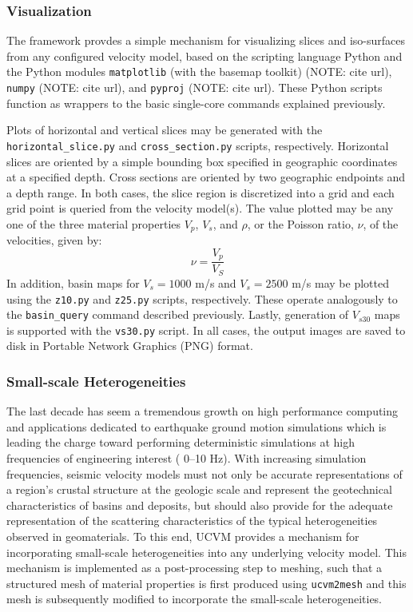 \subsubsection{Visualization}

The framework provdes a simple mechanism for visualizing slices and iso-surfaces from any configured velocity model, based on the scripting language Python and the Python modules \texttt{matplotlib} (with the basemap toolkit) (NOTE: cite url), \texttt{numpy} (NOTE: cite url), and \texttt{pyproj} (NOTE: cite url). These Python scripts function as wrappers to the basic single-core commands explained previously.

Plots of horizontal and vertical slices may be generated with the \texttt{horizontal\_slice.py} and \texttt{cross\_section.py} scripts, respectively. Horizontal slices are oriented by a simple bounding box specified in geographic coordinates at a specified depth. Cross sections are oriented by two geographic endpoints and a depth range. In both cases, the slice region is discretized into a grid and each grid point is queried from the velocity model(s). The value plotted may be any one of the three material properties $V_p$, $V_s$, and $\rho$, or the Poisson ratio, $\nu$, of the velocities, given by:
\begin{equation}
\nu = \frac{V_p}{V_S}
\end{equation}
In addition, basin maps for $V_s = 1000$ m/s and $V_s = 2500$ m/s may be plotted using the \texttt{z10.py} and \texttt{z25.py} scripts, respectively. These operate analogously to the \texttt{basin\_query} command described previously. Lastly, generation of $V_{s30}$ maps is supported with the \texttt{vs30.py} script. In all cases, the output images are saved to disk in Portable Network Graphics (PNG) format.

\subsubsection{Small-scale Heterogeneities}

The last decade has seem a tremendous growth on high performance computing and applications dedicated to earthquake ground motion simulations which is leading the charge toward performing deterministic simulations at high frequencies of engineering interest (\fmax{} 0--10 Hz). With increasing simulation frequencies, seismic velocity models must not only be accurate representations of a region's crustal structure at the geologic scale and represent the geotechnical characteristics of basins and deposits, but should also provide for the adequate representation of the scattering characteristics of the typical heterogeneities observed in geomaterials. To this end, UCVM provides a mechanism for incorporating small-scale heterogeneities into any underlying velocity model. This mechanism is implemented as a post-processing step to meshing, such that a structured mesh of material properties is first produced using \texttt{ucvm2mesh} and this mesh is subsequently modified to incorporate the small-scale heterogeneities.

